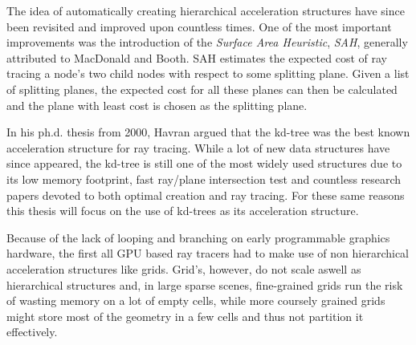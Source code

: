 
The idea of automatically creating hierarchical acceleration structures have
since been revisited and improved upon countless times. One of the most
important improvements was the introduction of the \textit{Surface Area
  Heuristic}, \textit{SAH}, generally attributed to MacDonald and
Booth. SAH estimates the expected cost of ray tracing a
node's two child nodes with respect to some splitting plane. Given a list of
splitting planes, the expected cost for all these planes can then be calculated
and the plane with least cost is chosen as the splitting plane.



In his ph.d. thesis from 2000, Havran argued that the
kd-tree was the best known acceleration structure for ray tracing. While a lot
of new data structures have since appeared, the kd-tree is still one of the most
widely used structures due to its low memory footprint, fast ray/plane
intersection test and countless research papers devoted to both optimal creation
and ray tracing. For these same reasons this thesis will focus on the use of
kd-trees as its acceleration structure.




Because of the lack of looping and branching on early programmable graphics
hardware, the first all GPU based ray tracers had to make use of non
hierarchical acceleration structures like grids. Grid's,
however, do not scale aswell as hierarchical structures and, in large sparse
scenes, fine-grained grids run the risk of wasting memory on a lot of empty
cells, while more coursely grained grids might store most of the geometry in a
few cells and thus not partition it effectively.


